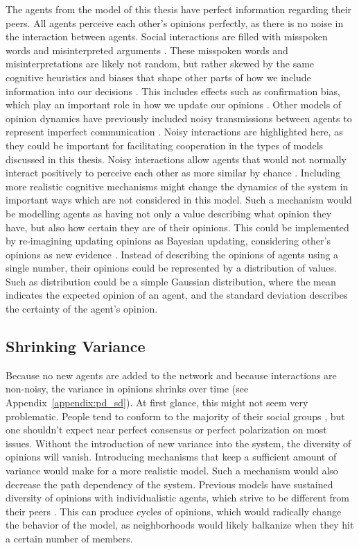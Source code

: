 \documentclass[11pt]{article}
\begin{document}
The agents from the model of this thesis have perfect information regarding their peers. All agents perceive each other's opinions perfectly, as there is no noise in the interaction between agents. Social interactions are filled with misspoken words and misinterpreted arguments \cite{jussim_influence_1989}.
These misspoken words and misinterpretations are likely not random, but rather skewed by the same cognitive heuristics and biases that shape other parts of how we include information into our decisions \cite{arceneaux_cognitive_2012}. This includes effects such as confirmation bias, which play an important role in how we update our opinions \cite{allahverdyan_opinion_2014}. 
Other models of opinion dynamics have previously included noisy transmissions between agents to represent imperfect communication \cite{sirbu2017opinion,su_noise_2017}. Noisy interactions are highlighted here, as they could be important for facilitating cooperation in the types of models discussed in this thesis. Noisy interactions allow agents that would not normally interact positively to perceive each other as more similar by chance \cite{allahverdyan_opinion_2014,su_noise_2017}. Including more realistic cognitive mechanisms might change the dynamics of the system in important ways which are not considered in this model. Such a mechanism would be modelling agents as having not only a value describing what opinion they have, but also how certain they are of their opinions. This could be implemented by re-imagining updating opinions as Bayesian updating, considering other’s opinions as new evidence \cite{allahverdyan_opinion_2014}. Instead of describing the opinions of agents using a single number, their opinions could be represented by a distribution of values. Such as distribution could be a simple Gaussian distribution, where the mean indicates the expected opinion of an agent, and the standard deviation describes the certainty of the agent’s opinion. 

\subsection{Shrinking Variance}
Because no new agents are added to the network and because interactions are non-noisy, the variance in opinions shrinks over time (see Appendix~\ref{appendix:pd_sd}). At first glance, this might not seem very problematic. People tend to conform to the majority of their social groups \cite{mcpherson_birds_2001}, but one shouldn't expect near perfect consensus or perfect polarization on most issues. Without the introduction of new variance into the system, the diversity of opinions will vanish. Introducing mechanisms that keep a sufficient amount of variance would make for a more realistic model. Such a mechanism would also decrease the path dependency of the system. Previous models have sustained diversity of opinions with individualistic agents, which strive to be different from their peers \cite{mas_individualization_2010}. This can produce cycles of opinions, which would radically change the behavior of the model, as neighborhoods would likely balkanize when they hit a certain number of members.
\end{document}
